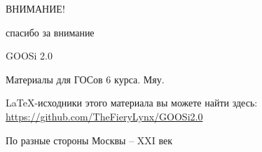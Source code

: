 \begingroup
    \centerline{ВНИМАНИЕ!}
    \centerline{спасибо за внимание}
    \centerline{\hfill\hrulefill\hrulefill\hfill}
    \vskip1.5cm
    \centerline{GOOSi 2.0}
    \centerline{Материалы для ГОСов 6 курса. Мяу.}
    \vskip1.5cm
    
    LaTeX-исходники этого материала вы можете найти здесь: \url{https://github.com/TheFieryLynx/GOOSi2.0}

    \bigbreak
    \bigbreak
    \bigbreak
    \bigbreak
    \bigbreak

    \vfill
    \centerline{По разные стороны Москвы -- XXI век}
\endgroup

